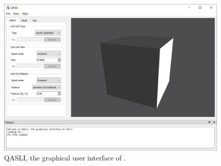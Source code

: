 \begin{figure}[htb]
	\centering
	\includegraphics[width=\linewidth]{figures/gui.png}%
	
	\caption{QASLI, the graphical user interface of \asli{}.}
	\label{fig:gui}
\end{figure}

